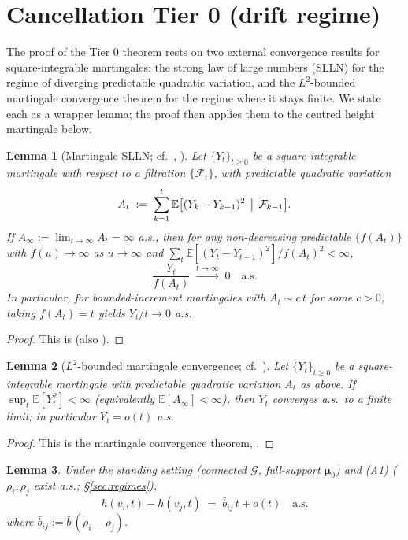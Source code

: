 \documentclass[11pt]{article}
\newtheorem{lem}{Lemma}
\theoremstyle{definition}
\begin{document}
\section{Cancellation Tier 0 (drift regime)}
\label{sec:thmC}

The proof of the Tier 0 theorem rests on two external convergence results for square-integrable martingales: the strong law of large numbers (SLLN) for the regime of diverging predictable quadratic variation, and the $L^2$-bounded martingale convergence theorem for the regime where it stays finite. We state each as a wrapper lemma; the proof then applies them to the centred height martingale below.

\begin{lem}[Martingale SLLN; cf.\ {\cite[Thm.~4.5.3]{Durrett2019}}, {\cite[Thm.~20.10]{Davidson1994}}]
\label{lem:MSLLN}
Let $\{Y_t\}_{t \geq 0}$ be a square-integrable martingale with respect to a filtration $\{\mathcal{F}_t\}$, with predictable quadratic variation
\[
  A_t \;:=\; \sum_{k=1}^{t} \mathbb{E}\bigl[(Y_k - Y_{k-1})^2 \,\bigm|\, \mathcal{F}_{k-1}\bigr].
\]
If $A_\infty := \lim_{t \to \infty} A_t = \infty$ a.s., then for any non-decreasing predictable $\{f(A_t)\}$ with $f(u) \to \infty$ as $u \to \infty$ and $\sum_t \mathbb{E}[(Y_t - Y_{t-1})^2] / f(A_t)^2 < \infty$,
\[
  \frac{Y_t}{f(A_t)} \;\xrightarrow{t \to \infty}\; 0 \quad \text{a.s.}
\]
In particular, for bounded-increment martingales with $A_t \sim c\,t$ for some $c > 0$, taking $f(A_t) = t$ yields $Y_t/t \to 0$ a.s.
\end{lem}
\begin{proof}
This is \cite[Thm.~4.5.3]{Durrett2019} (also \cite[Thm.~20.10]{Davidson1994}).
\end{proof}

\begin{lem}[$L^2$-bounded martingale convergence; cf.\ {\cite[Thm.~4.5.2]{Durrett2019}}]
\label{lem:L2mart}
Let $\{Y_t\}_{t \geq 0}$ be a square-integrable martingale with predictable quadratic variation $A_t$ as above. If $\sup_t \mathbb{E}[Y_t^2] < \infty$ (equivalently $\mathbb{E}[A_\infty] < \infty$), then $Y_t$ converges a.s.\ to a finite limit; in particular $Y_t = o(t)$ a.s.
\end{lem}
\begin{proof}
This is the martingale convergence theorem, \cite[Thm.~4.5.2]{Durrett2019}.
\end{proof}


\begin{lem}
\label{lem:height-decomp}
Under the standing setting (connected $\mathcal{G}$, full-support $\boldsymbol{\mu}_0$) and (A1) ($\rho_i, \rho_j$ exist a.s.; \S\ref{sec:regimes}),
\begin{equation*}
h(v_i,t) - h(v_j,t) \;=\; \bar{b}_{ij}\,t + o(t) \quad \text{a.s.}
\end{equation*}
where $\bar{b}_{ij} := \bar b\,(\rho_i - \rho_j)$.
\end{lem}
\end{document}
